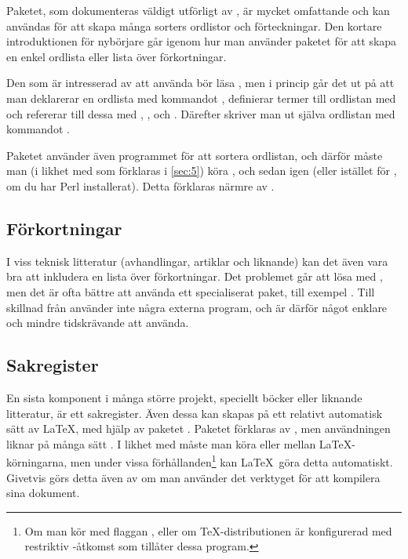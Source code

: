 \documentclass[10pt,../../a4.tex]{subfiles}
\begin{document}
Paketet, som dokumenteras väldigt utförligt av \textcite{Talbot13a},
är mycket omfattande och kan användas för att skapa många sorters
ordlistor och förteckningar. Den kortare introduktionen för nybörjare
\parencite{Talbot13b} går igenom hur man använder paketet för att skapa
en enkel ordlista eller lista över förkortningar.

Den som är intresserad av att använda  bör läsa 
\textcite{Talbot13b}, men i princip går det ut på att man deklarerar en
ordlista med kommandot , definierar termer till
ordlistan med  och refererar till dessa med
, ,  och . Därefter skriver man
ut själva ordlistan med kommandot .

Paketet använder även programmet  för att sortera ordlistan,
och därför måste man (i likhet med  som förklaras i
\cref{sec:5}) köra ,  och sedan 
igen (eller  istället för , om du har
Perl installerat). Detta förklaras närmre av
\textcite{Talbot13a,Talbot13b}.

\subsection{Förkortningar}\label{sec:2:acro}
I viss teknisk litteratur (avhandlingar, artiklar och liknande) kan det 
även vara bra att inkludera en lista över förkortningar. Det problemet
går att lösa med , men det är ofta bättre att använda
ett specialiserat paket, till exempel 
\parencite{Niederberger13}. Till skillnad
från  använder  inte några externa program,
och är därför något enklare och mindre tidskrävande att använda.

\subsection{Sakregister}\label{sec:2:imakeidx}
En sista komponent i många större projekt, speciellt böcker eller
liknande litteratur, är ett sakregister. Även dessa kan skapas på ett
relativt automatisk sätt av \LaTeX, med hjälp av paketet .
Paketet förklaras av \textcite{Beccari12}, men användningen liknar
på många sätt . I likhet med  måste man
köra  eller  mellan \LaTeX-körningarna, men 
under vissa förhållanden\footnote{Om man kör  med flaggan
, eller om \TeX-distributionen är konfigurerad med
restriktiv -åtkomst som tillåter dessa program.} kan \LaTeX\ 
göra detta automatiskt. Givetvis görs detta även av  om man
använder det verktyget för att kompilera sina dokument.
\end{document}
